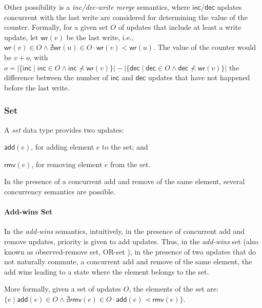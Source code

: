\documentclass[12pt]{article}
\def\land{\mathrel{\wedge}}
\begin{document}
Other possibility is a \emph{inc/dec-write merge} semantics, where $\mathsf{inc}$/$\mathsf{dec}$ 
updates concurrent with the last write are considered for determining the value
of the counter.  
Formally, for a given set $O$ of updates that include at least a write update, 
let $\mathsf{wr}(v)$ be the last write, i.e., $\mathsf{wr}(v) \in O \land \nexists \mathsf{wr}(u) \in O \cdot \mathsf{wr}(v) < \mathsf{wr}(u)$. 
The value of the counter would be
$v + o$, 
with $o = \left| \{ \mathsf{inc} \mid \mathsf{inc} \in O \wedge \mathsf{inc} \not \prec \mathsf{wr}(v)\} \right| - \left| \{ \mathsf{dec} \mid \mathsf{dec} \in O \wedge \mathsf{dec} \not \prec \mathsf{wr}(v)\} \right|$
the difference between the number of $\mathsf{inc}$ and $\mathsf{dec}$ updates that have not happened before the last write.








\subsubsection{Set}

A \emph{set} data type provides two updates:
\begin{inparaenum}[(i)]
\item $\mathsf{add}(e)$, for adding element $e$ to the set; and 
\item $\mathsf{rmv}(e)$, for removing element $e$ from the set.
\end{inparaenum}
In the presence of a concurrent add and remove of the same element,
several concurrency semantics are possible.

\paragraph{Add-wins Set}
In the \emph{add-wins} semantics, intuitively, in the presence of concurrent 
add and remove updates, priority is given to add updates.
Thus, in the \emph{add-wins} set (also known as observed-remove set, OR-set 
\cite{Shapiro11Conflict}), in the presence of two updates that do not 
naturally commute, a concurrent add and remove of the same element, the 
add wins leading to a state where the element belongs to the set.

More formally, given a set of updates $O$, the elements of the set are:
$\{e \mid \mathsf{add}(e) \in O \land \nexists \mathsf{rmv}(e) \in O \cdot \mathsf{add}(e) \prec \mathsf{rmv}(e)\}$.
\end{document}

